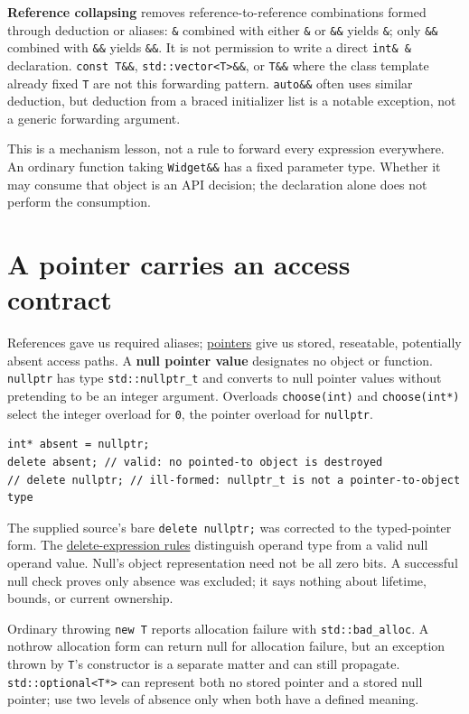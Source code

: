 \textbf{Reference collapsing} removes reference-to-reference combinations formed through deduction or aliases: \texttt{\&} combined with either \texttt{\&} or \texttt{\&\&} yields \texttt{\&}; only \texttt{\&\&} combined with \texttt{\&\&} yields \texttt{\&\&}. It is not permission to write a direct \texttt{int\&\ \&} declaration. \texttt{const\ T\&\&}, \texttt{std::vector\textless{}T\textgreater{}\&\&}, or \texttt{T\&\&} where the class template already fixed \texttt{T} are not this forwarding pattern. \texttt{auto\&\&} often uses similar deduction, but deduction from a braced initializer list is a notable exception, not a generic forwarding argument.

This is a mechanism lesson, not a rule to forward every expression everywhere. An ordinary function taking \texttt{Widget\&\&} has a fixed parameter type. Whether it may consume that object is an API decision; the declaration alone does not perform the consumption.

\section{A pointer carries an access contract}\label{01-foundations-i-ch003-a-pointer-carries-an-access-contract}

References gave us required aliases; \hyperref[appendix-afae48c31800]{pointers} give us stored, reseatable, potentially absent access paths. A \textbf{null pointer value} designates no object or function. \texttt{nullptr} has type \texttt{std::nullptr\_t} and converts to null pointer values without pretending to be an integer argument. Overloads \texttt{choose(int)} and \texttt{choose(int*)} select the integer overload for \texttt{0}, the pointer overload for \texttt{nullptr}.

\begin{verbatim}
int* absent = nullptr;
delete absent; // valid: no pointed-to object is destroyed
// delete nullptr; // ill-formed: nullptr_t is not a pointer-to-object type
\end{verbatim}

The supplied source's bare \texttt{delete\ nullptr;} was corrected to the typed-pointer form. The \href{https://eel.is/c++draft/expr.delete}{delete-expression rules} distinguish operand type from a valid null operand value. Null's object representation need not be all zero bits. A successful null check proves only absence was excluded; it says nothing about lifetime, bounds, or current ownership.

Ordinary throwing \texttt{new\ T} reports allocation failure with \texttt{std::bad\_alloc}. A nothrow allocation form can return null for allocation failure, but an exception thrown by \texttt{T}'s constructor is a separate matter and can still propagate. \texttt{std::optional\textless{}T*\textgreater{}} can represent both no stored pointer and a stored null pointer; use two levels of absence only when both have a defined meaning.

